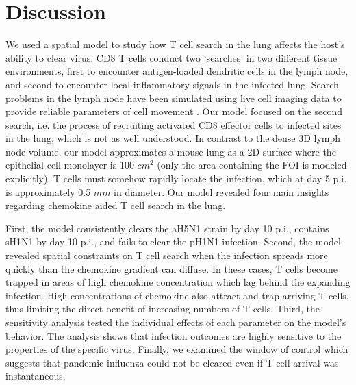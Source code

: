 \documentclass[preprint,10pt,authoryear]{elsarticle}
\begin{document}
\section*{Discussion}

We used a spatial model to study how T cell search in the lung affects the host's ability to clear virus.  CD8 T cells conduct two `searches' in two different tissue environments, first to encounter antigen-loaded dendritic cells in the lymph node, and second to encounter local inflammatory signals in the infected lung.  Search problems in the lymph node have been simulated using live cell imaging data to provide reliable parameters of cell movement \citep{Mirsky2011, Vroomans2012}.  Our model focused on the second search, i.e. the process of recruiting activated CD8 effector cells to infected sites in the lung, which is not as well understood.  In contrast to the dense 3D lymph node volume, our model approximates a mouse lung as a 2D surface where the epithelial cell monolayer is 100 $cm^2$ (only the area containing the FOI is modeled explicitly).  T cells must somehow rapidly locate the infection, which at day 5 p.i. is approximately 0.5 $mm$ in diameter.  Our model revealed four main insights regarding chemokine aided T cell search in the lung.

First, %
the model consistently clears the aH5N1 strain by day 10 p.i., contains sH1N1 by day 10 p.i., and fails to clear the pH1N1 infection.  Second, the model revealed spatial constraints on T cell search when the infection spreads more quickly than the chemokine gradient can diffuse.  In these cases, T cells become trapped in areas of high chemokine concentration which lag behind the expanding infection.  High concentrations of chemokine also attract and trap arriving T cells, thus limiting the direct benefit of increasing numbers of T cells. Third, the sensitivity analysis tested the individual effects of each parameter on the model's behavior.  The analysis shows that infection outcomes are highly sensitive to the properties of the specific virus.
Finally, we examined the window of control which suggests that pandemic influenza could not be cleared even if T cell arrival was instantaneous.  


\end{document}
